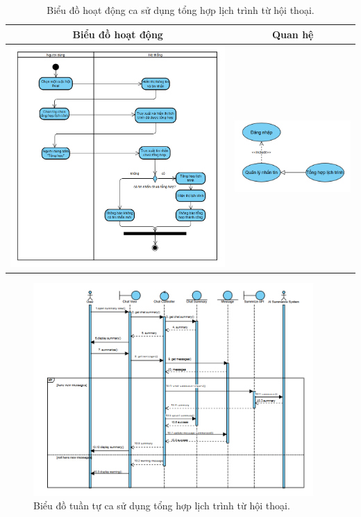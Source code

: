 \begin{table}[H] %
    \centering
    \caption{Biểu đồ hoạt động ca sử dụng tổng hợp lịch trình từ hội thoại.} %
    \label{tab:uc_summarize_itinerary_diagrams} %
    \begin{tabular}{| c | c |}
        \hline
        \textbf{Biểu đồ hoạt động} & \textbf{Quan hệ} \\
        \hline
        \includegraphics[width=0.5\linewidth]{figures/c3/3-3-10-ad.png} %
        &
        \includegraphics[width=0.45\linewidth]{figures/c3/3-3-10-rd.png} \\ %
        \hline
    \end{tabular}
\end{table}

\begin{figure}[H]
    \centering
    \includegraphics[width=0.95\textwidth]{figures/c3/3-3-10-sd.png} %
    \caption{Biểu đồ tuần tự ca sử dụng tổng hợp lịch trình từ hội thoại.}
    \label{fig:3-3-10-sequence-diagram}
\end{figure}